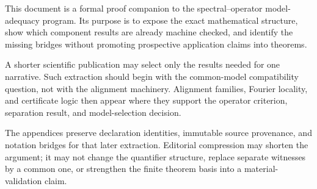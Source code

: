 This document is a formal proof companion to the spectral--operator model-adequacy
program.  Its purpose is to expose the exact mathematical structure, show which
component results are already machine checked, and identify the missing bridges without
promoting prospective application claims into theorems.

A shorter scientific publication may select only the results needed for one narrative.
Such extraction should begin with the common-model compatibility question, not with the
alignment machinery.  Alignment families, Fourier locality, and certificate logic then
appear where they support the operator criterion, separation result, and model-selection
decision.

The appendices preserve declaration identities, immutable source provenance, and
notation bridges for that later extraction.  Editorial compression may shorten the
argument; it may not change the quantifier structure, replace separate witnesses by a
common one, or strengthen the finite theorem basis into a material-validation claim.
